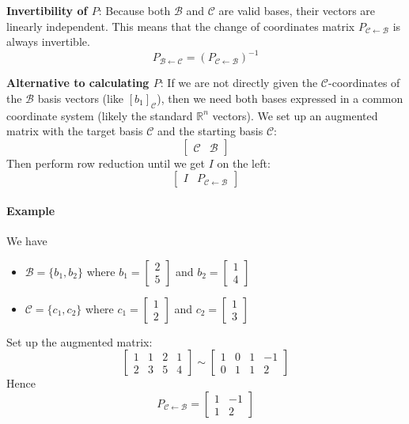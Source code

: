 \documentclass[../linear-algebra.tex]{subfiles}
\begin{document}
\medskip
\noindent \textbf{Invertibility of $P$}: Because both $\mathcal{B}$ and $\mathcal{C}$ are valid bases, their vectors are linearly independent. This means that the change of coordinates matrix $P_{\mathcal{C}\leftarrow\mathcal{B}}$ is always invertible.
$$P_{\mathcal{B}\leftarrow\mathcal{C}} = (P_{\mathcal{C}\leftarrow\mathcal{B}})^{-1}$$

\medskip
\noindent \textbf{Alternative to calculating $P$}: If we are not directly given the $\mathcal{C}$-coordinates of the $\mathcal{B}$ basis vectors (like $[b_1]_{\mathcal{C}}$), then we need both bases expressed in a common coordinate system (likely the standard $\mathbb{R}^n$ vectors).\newline
We set up an augmented matrix with the target basis $\mathcal{C}$ and the starting basis $\mathcal{C}$:
$$\left[ \begin{array}{c|c} \mathcal{C} & \mathcal{B} \end{array} \right]$$
Then perform row reduction until we get $I$ on the left:
$$\left[ \begin{array}{c|c} I & P_{\mathcal{C}\leftarrow\mathcal{B}} \end{array} \right]$$
\paragraph{Example} We have\newline
\begin{itemize}
    \item $\mathcal{B} = \{b_1, b_2\}$ where $b_1 = \begin{bmatrix} 2 \\ 5 \end{bmatrix}$ and $b_2 = \begin{bmatrix} 1 \\ 4 \end{bmatrix}$
    \item $\mathcal{C} = \{c_1, c_2\}$ where $c_1 = \begin{bmatrix} 1 \\ 2 \end{bmatrix}$ and $c_2 = \begin{bmatrix} 1 \\ 3 \end{bmatrix}$
\end{itemize}
Set up the augmented matrix:
$$\left[ \begin{array}{cc|cc} 1 & 1 & 2 & 1 \\ 2 & 3 & 5 & 4 \end{array} \right] \sim \left[ \begin{array}{cc|cc} 1 & 0 & 1 & -1 \\ 0 & 1 & 1 & 2 \end{array} \right]$$
Hence 
$$P_{\mathcal{C}\leftarrow\mathcal{B}} = \begin{bmatrix} 1 & -1 \\ 1 & 2 \end{bmatrix}$$
\end{document}
